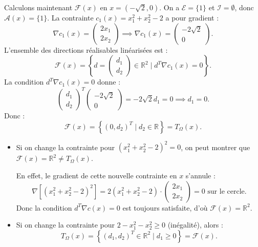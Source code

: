Calculons maintenant $\mathcal{F}(x)$ en $x = (-\sqrt{2}, 0)$.
    On a $\mathcal{E} = \{1\}$ et $\mathcal{I} = \emptyset$, donc $\mathcal{A}(x) = \{1\}$. 
    La contrainte $c_1(x) = x_1^2 + x_2^2 - 2$ a pour gradient :
    \begin{equation}
        \nabla c_1(x) = \begin{pmatrix} 2x_1 \\ 2x_2 \end{pmatrix} \implies \nabla c_1(x) = \begin{pmatrix} -2\sqrt{2} \\ 0 \end{pmatrix}.
    \end{equation}
    L'ensemble des directions réalisables linéarisées est :
    \begin{equation}
        \mathcal{F}(x) = \left\{ d = \begin{pmatrix} d_1 \\ d_2 \end{pmatrix} \in \mathbb{R}^2 \mid d^T \nabla c_1(x) = 0 \right\}.
    \end{equation}
    La condition $d^T \nabla c_1(x) = 0$ donne :
    \begin{equation}
        \begin{pmatrix} d_1 \\ d_2 \end{pmatrix}^T \begin{pmatrix} -2\sqrt{2} \\ 0 \end{pmatrix} = -2\sqrt{2} d_1 = 0 \implies d_1 = 0.
    \end{equation}
    Donc :
    \begin{equation}
        \mathcal{F}(x) = \left\{ (0, d_2)^T \mid d_2 \in \mathbb{R} \right\} = T_\Omega(x).
    \end{equation}

\begin{remarque}
    \begin{itemize}
        \item Si on change la contrainte pour $(x_1^2 + x_2^2 - 2)^2 = 0$, on peut montrer que $\mathcal{F}(x) = \mathbb{R}^2 \neq T_\Omega(x)$.
        
        En effet, le gradient de cette nouvelle contrainte en $x$ s'annule :
        \[ \nabla \left[ (x_1^2 + x_2^2 - 2)^2 \right] = 2(x_1^2 + x_2^2 - 2) \cdot \begin{pmatrix} 2x_1 \\ 2x_2 \end{pmatrix} = 0 \text{ sur le cercle.} \]
        Donc la condition $d^T \nabla c(x) = 0$ est toujours satisfaite, d'où $\mathcal{F}(x) = \mathbb{R}^2$.
        
        \item Si on change la contrainte pour $2 - x_1^2 - x_2^2 \geq 0$ (inégalité), alors :
        \begin{equation}
            T_\Omega(x) = \left\{ (d_1, d_2)^T \in \mathbb{R}^2 \mid d_1 \geq 0 \right\} = \mathcal{F}(x).
        \end{equation}
    \end{itemize}
\end{remarque}

